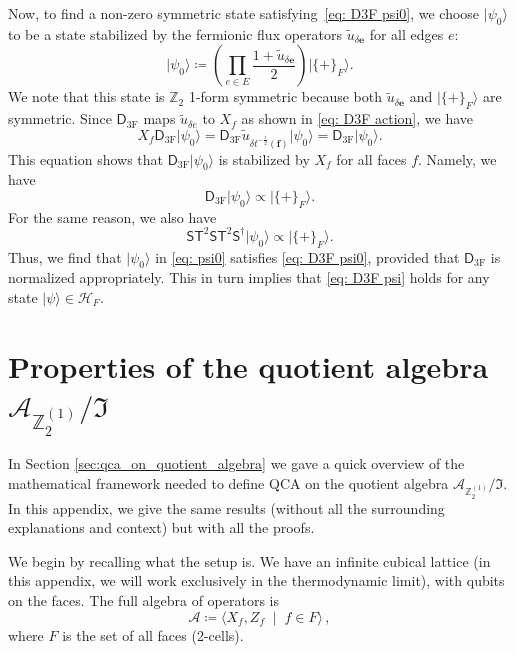 \documentclass[aps,twocolumn,prx,floatfix,preprintnumbers, nofootinbib,10pt]{revtex4-2}
\numberwithin{equation}{section}
\theoremstyle{definition}
\theoremstyle{remark}
\theoremstyle{claim}
\newcommand{\be}{\begin{equation}}
\newcommand{\ee}{\end{equation}}
\newcommand{\Z}{{\mathbb Z}}
\def\ket#1{{|{#1}\rangle}}
\newcommand{\mc}[1]{\mathcal{#1}}
\begin{document}
Now, to find a non-zero symmetric state satisfying~\eqref{eq: D3F psi0}, we choose $\ket{\psi_0}$ to be a state stabilized by the fermionic flux operators $\tilde{u}_{\delta \bm{e}}$ for all edges $e$:
\begin{equation}
\ket{\psi_0} \coloneq \left( \prod_{e \in E} \frac{1+\tilde{u}_{\delta \bm{e}}}{2} \right) \ket{\{+\}_F}.
\label{eq: psi0}
\end{equation}
We note that this state is $\mathbb{Z}_2$ 1-form symmetric because both $\tilde{u}_{\delta \bm{e}}$ and $\ket{\{+\}_F}$ are symmetric.
Since $\mathsf{D}_\text{3F}$ maps $\tilde{u}_{\delta e}$ to $X_f$ as shown in \eqref{eq: D3F action}, we have
\begin{equation}
X_f \mathsf{D}_\text{3F} \ket{\psi_0} = \mathsf{D}_\text{3F} \tilde{u}_{\delta t^{-\frac{1}{2}}(\bm{f})} \ket{\psi_0} = \mathsf{D}_\text{3F} \ket{\psi_0}.
\end{equation}
This equation shows that $\mathsf{D}_\text{3F} \ket{\psi_0}$ is stabilized by $X_f$ for all faces $f$.
Namely, we have
\begin{equation}
\mathsf{D}_\text{3F} \ket{\psi_0} \propto \ket{\{+\}_F}.
\end{equation}
For the same reason, we also have
\begin{equation}
\mathsf{S}\mathsf{T}^2\mathsf{S}\mathsf{T}^2\mathsf{S}^{\dagger} \ket{\psi_0} \propto \ket{\{+\}_F}.
\end{equation}
Thus, we find that $\ket{\psi_0}$ in \eqref{eq: psi0} satisfies \eqref{eq: D3F psi0}, provided that $\mathsf{D}_\text{3F}$ is normalized appropriately.
This in turn implies that \eqref{eq: D3F psi} holds for any state $\ket{\psi} \in \mathcal{H}_F$.

\section{Properties of the quotient algebra $\mc{A}_{\Z_2^{(1)}} / \mathfrak{I}$}\label{app:quotient_algebra}

In Section \ref{sec:qca_on_quotient_algebra} we gave a quick overview of the mathematical framework needed to define QCA on the quotient algebra $\mc{A}_{\Z_2^{(1)}} / \mathfrak{I}$. In this appendix, we give the same results (without all the surrounding explanations and context) but with all the proofs.

We begin by recalling what the setup is. We have an infinite cubical lattice (in this appendix, we will work exclusively in the thermodynamic limit), with qubits on the faces. The full algebra of operators is
\be
\mc{A} \coloneqq \langle X_f, Z_f \; \mid \; f \in F \rangle \,,
\ee
where $F$ is the set of all faces (2-cells).
\end{document}

